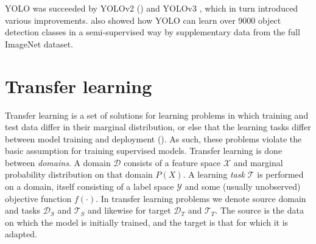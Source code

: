 YOLO was succeeded by YOLOv2 (\cite{redmon2017yolo9000}) and YOLOv3 \cite{redmon2018yolov3}, which in turn introduced various improvements. \cite{redmon2017yolo9000} also showed how YOLO can learn over 9000 object detection classes in a semi-supervised way by supplementary data from the full ImageNet dataset.

\section{Transfer learning}

Transfer learning is a set of solutions for learning problems in which training and test data differ in their marginal distribution, or else that the learning tasks differ between model training and deployment (\cite{pan2009survey}). As such, these problems violate the basic assumption for training supervised models. Transfer learning is done between \emph{domains}. A domain $\mathcal{D}$ consists of a feature space $\mathcal{X}$ and marginal probability distribution on that domain $P(X)$. A learning \emph{task} $\mathcal{T}$ is performed on a domain, itself consisting of a label space $\mathcal{Y}$ and some (usually unobserved) objective function $f(\cdot)$. In transfer learning problems we denote source domain and tasks $\mathcal{D}_S$ and $\mathcal{T}_S$ and likewise for target $\mathcal{D}_T$ and $\mathcal{T}_T$. The source is the data on which the model is initially trained, and the target is that for which it is adapted.

